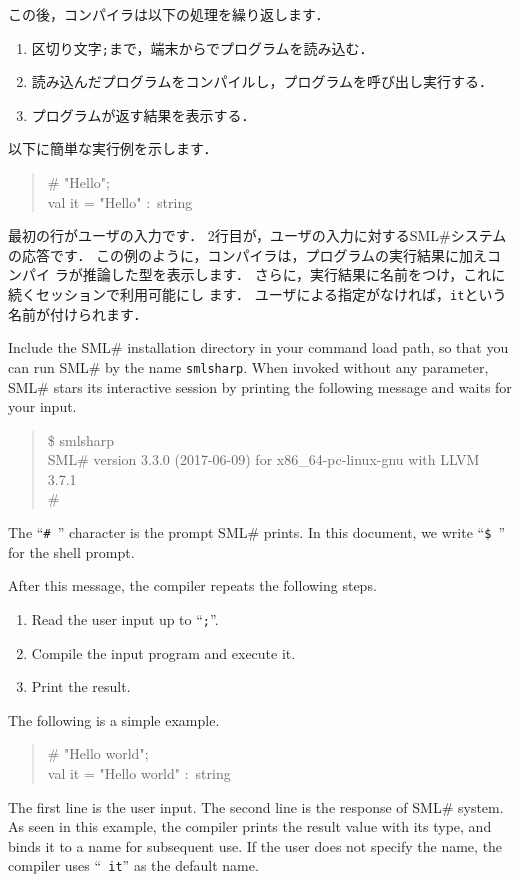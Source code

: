 \documentclass{jbook}
\newcommand{\smlsharp}{SML\#}
\newcommand{\version}{3.3.0}
\newcommand{\releaseDate}{2017-06-09}
\newenvironment{program}{\begin{quote}\begin{tt}}%
                        {\end{tt}\end{quote}}
\begin{document}
	この後，コンパイラは以下の処理を繰り返します．
\begin{enumerate}
\item 区切り文字{\tt ;}まで，端末からでプログラムを読み込む．
\item 読み込んだプログラムをコンパイルし，プログラムを呼び出し実行する．
\item プログラムが返す結果を表示する．
\end{enumerate}
	以下に簡単な実行例を示します．
\begin{tt}
\begin{quote}
\# "Hello";\\
val it = "Hello" :~string
\end{quote}
\end{tt}
	最初の行がユーザの入力です．
	2行目が，ユーザの入力に対する\smlsharp{}システムの応答です．
	この例のように，コンパイラは，プログラムの実行結果に加えコンパイ
ラが推論した型を表示します．
	さらに，実行結果に名前をつけ，これに続くセッションで利用可能にし
ます．
	ユーザによる指定がなければ，{\tt it}という名前が付けられます．
\else%

	Include the \smlsharp{} installation directory in your command
load path,  so that you can run \smlsharp{} by the name {\tt smlsharp}.
	When invoked without any parameter, \smlsharp{} stars its
interactive session by printing the following message and waits for your
input.
\begin{program}
\$ smlsharp\\
SML\# version \version{} (\releaseDate{}) for x86\_64-pc-linux-gnu with LLVM 3.7.1\\
\# 
\end{program}
	The ``{\tt \#\ }'' character is the prompt \smlsharp{}
prints.
	In this document, we write ``{\tt \$\ }'' for the 
shell prompt.

	After this message, the compiler repeats the following steps. 
\begin{enumerate}
\item Read the user input up to ``{\tt ;}''.
\item Compile the input program and execute it.
\item Print the result.
\end{enumerate}
	The following is a simple example.
\begin{tt}
\begin{quote}
\# "Hello world";\\
val it = "Hello world" :~string
\end{quote}
\end{tt}
	The first line is the user input.
	The second line is the response of \smlsharp{} system.
	As seen in this example, the compiler prints the result value with
its type, and binds it to a name for subsequent use.
	If the user does not specify the name, the compiler uses  ``{\tt
it}'' as the default name.
\end{document}
